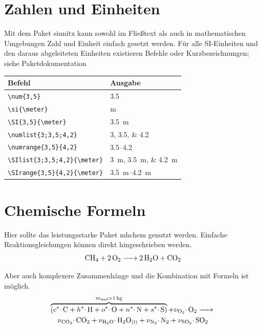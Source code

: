 \section{Zahlen und Einheiten}
\label{sec:zahlen-einheiten}

Mit dem Paket siunitx kann sowohl im Fließtext als auch in mathematischen Umgebungen Zahl und Einheit einfach gesetzt werden. Für alle SI-Einheiten und den daraus abgeleiteten Einheiten existieren Befehle oder Kurzbezeichnungen; siehe Paketdokumentation
\begin{center}
	\begin{tabular}{ll}
		Befehl &	Ausgabe\\
		\midrule
		\lstinline|\num{3,5}| &\num{3,5} \\
		\lstinline|\si{\meter}| &\si{\meter}  \\
		\lstinline|\SI{3,5}{\meter}| &\SI{3,5}{\meter}  \\
		\lstinline|\numlist{3;3,5;4,2}| &	\numlist{3;3,5;4,2}  \\
		\lstinline|\numrange{3,5}{4,2}| &\numrange{3,5}{4,2}  \\
		\lstinline|\SIlist{3;3,5;4,2}{\meter}| &\SIlist{3;3,5;4,2}{\meter}  \\
		\lstinline|\SIrange{3,5}{4,2}{\meter}|&\SIrange{3,5}{4,2}{\meter}\\
	\end{tabular}
\end{center}
  

\section{Chemische Formeln}
\label{sec:chem-formeln}

Hier sollte das leistungsstarke Paket mhchem genutzt werden. Einfache Reaktionsgleichungen können direkt hingeschrieben werden.
\begin{equation}
\ce{CH4 + 2O2 -> 2H2O + CO2}
\end{equation}

Aber auch komplexere Zusammenhänge und die Kombination mit Formeln ist möglich.
\begin{multline}
\label{eq:kohle_reaktion}
\overbrace{\left(\ce{$c^*\cdot$ C + $h^*\cdot$ H + $o^*\cdot$ O + $n^*\cdot$ N + $s^*\cdot$ S}\right)}^{m_{\text{waf}}=\SI{1}{\kg}} +
\ce{$\nu_{\ce{O2}}\cdot$ O2 -> }\\
\ce{$\nu_{\ce{CO2}}\cdot$ CO2 + $\nu_{\ce{H2O}}\cdot$ H2O_{(l)} + $\nu_{\ce{N2}}\cdot$ N2 + $\nu_{\ce{SO2}}\cdot$ SO2}
\end{multline}

